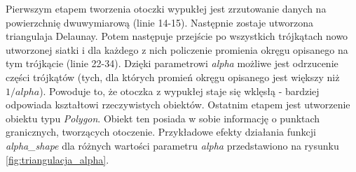 Pierwszym etapem tworzenia otoczki wypukłej jest zrzutowanie danych na powierzchnię dwuwymiarową (linie 14-15).
Następnie zostaje utworzona triangulaja Delaunay. Potem następuje przejście po wszystkich trójkątach nowo
utworzonej siatki i dla każdego z nich policzenie promienia okręgu opisanego na tym trójkącie (linie 22-34). Dzięki
parametrowi \textit{alpha} możliwe jest odrzucenie części trójkątów (tych, dla których promień okręgu opisanego jest większy niż $1/alpha$).
Powoduje to, że otoczka z wypukłej staje się wklęsłą - bardziej odpowiada kształtowi rzeczywistych obiektów.
Ostatnim etapem jest utworzenie obiektu typu \textit{Polygon}. Obiekt ten posiada w sobie informację
o punktach granicznych, tworzących otoczenie. Przykładowe efekty działania funkcji \textit{alpha\_shape} dla różnych wartości 
parametru \textit{alpha} przedstawiono na rysunku \ref{fig:triangulacja_alpha}.

